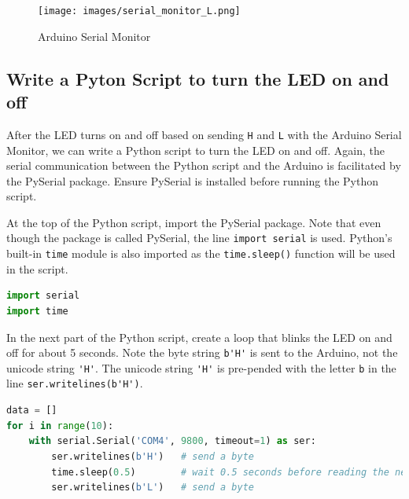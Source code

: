 \documentclass{book}
\begin{document}
\begin{figure}
\centering
\texttt{[image: images/serial\_monitor\_L.png]}
\caption{Arduino Serial Monitor}
\end{figure}
    




    
        \subsection{Write a Pyton Script to turn the LED on and
off}\label{write-a-pyton-script-to-turn-the-led-on-and-off}
    




    
        After the LED turns on and off based on sending \lstinline!H! and
\lstinline!L! with the Arduino Serial Monitor, we can write a Python
script to turn the LED on and off. Again, the serial communication
between the Python script and the Arduino is facilitated by the PySerial
package. Ensure PySerial is installed before running the Python script.

At the top of the Python script, import the PySerial package. Note that
even though the package is called PySerial, the line
\lstinline!import serial! is used. Python's built-in \lstinline!time!
module is also imported as the \lstinline!time.sleep()! function will be
used in the script.
    




    
        \begin{lstlisting}[language=Python]
import serial
import time
\end{lstlisting}
    




    
        In the next part of the Python script, create a loop that blinks the LED
on and off for about 5 seconds. Note the byte string \lstinline!b'H'! is
sent to the Arduino, not the unicode string \lstinline!'H'!. The unicode
string \lstinline!'H'! is pre-pended with the letter \lstinline!b! in
the line \lstinline!ser.writelines(b'H')!.
    




    
        \begin{lstlisting}[language=Python]
data = []
for i in range(10):
    with serial.Serial('COM4', 9800, timeout=1) as ser:
        ser.writelines(b'H')   # send a byte
        time.sleep(0.5)        # wait 0.5 seconds before reading the next line
        ser.writelines(b'L')   # send a byte
\end{lstlisting}
    
\end{document}
